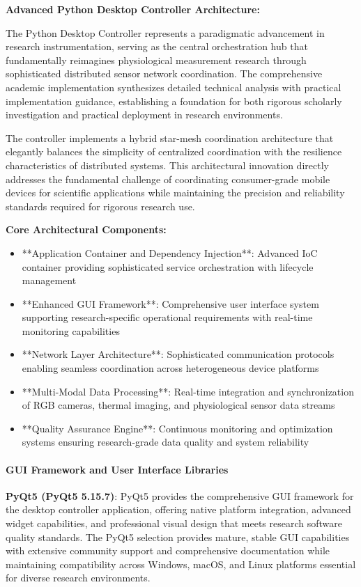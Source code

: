 \documentclass[11pt,a4paper]{article}
\begin{document}
\textbf{Advanced Python Desktop Controller Architecture:}

The Python Desktop Controller represents a paradigmatic advancement in research instrumentation, serving as the central
orchestration hub that fundamentally reimagines physiological measurement research through sophisticated distributed
sensor network coordination. The comprehensive academic implementation synthesizes detailed technical analysis with
practical implementation guidance, establishing a foundation for both rigorous scholarly investigation and practical
deployment in research environments.

The controller implements a hybrid star-mesh coordination architecture that elegantly balances the simplicity of
centralized coordination with the resilience characteristics of distributed systems. This architectural innovation
directly addresses the fundamental challenge of coordinating consumer-grade mobile devices for scientific applications
while maintaining the precision and reliability standards required for rigorous research use.

\textbf{Core Architectural Components:}

\begin{itemize}
\item **Application Container and Dependency Injection**: Advanced IoC container providing sophisticated service
  orchestration with lifecycle management
\item **Enhanced GUI Framework**: Comprehensive user interface system supporting research-specific operational requirements
  with real-time monitoring capabilities
\item **Network Layer Architecture**: Sophisticated communication protocols enabling seamless coordination across
  heterogeneous device platforms
\item **Multi-Modal Data Processing**: Real-time integration and synchronization of RGB cameras, thermal imaging, and
  physiological sensor data streams
\item **Quality Assurance Engine**: Continuous monitoring and optimization systems ensuring research-grade data quality and
  system reliability

\end{itemize}
\paragraph{GUI Framework and User Interface Libraries}

\textbf{PyQt5 (PyQt5 5.15.7)}: PyQt5 provides the comprehensive GUI framework for the desktop controller application,
offering native platform integration, advanced widget capabilities, and professional visual design that meets research
software quality standards. The PyQt5 selection provides mature, stable GUI capabilities with extensive community
support and comprehensive documentation while maintaining compatibility across Windows, macOS, and Linux platforms
essential for diverse research environments.
\end{document}
